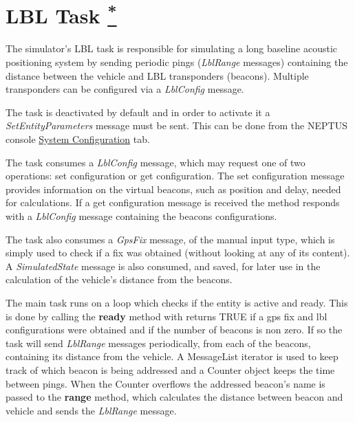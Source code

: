 \documentclass[10pt,a4paper]{article}
\begin{document}
\section{LBL Task \href{https://www.lsts.pt/docs/dune/dune-2017.01.0-dmsmw/d0/dd2/structSimulators_1_1LBL_1_1Task.html}{\textsuperscript{*}}}

\par The simulator's LBL task is responsible for simulating a long baseline acoustic positioning system by sending periodic pings (\textit{LblRange} messages) containing the distance between the vehicle and LBL transponders (beacons). Multiple transponders can be configured via a \textit{LblConfig} message.

\par The task is deactivated by default and in order to activate it a \textit{SetEntityParameters} message must be sent. This can be done from the NEPTUS console \href{https://whale.fe.up.pt/neptus/manual/trunk/elements.html#systems-configuration}{System Configuration} tab.

\par The task consumes a \textit{LblConfig} message, which may request one of two operations: set configuration or get configuration. The set configuration message provides information on the virtual beacons, such as position and delay,  needed for calculations. If a get configuration message is received the method responds with a \textit{LblConfig} message containing the beacons configurations.

\par The task also consumes a \textit{GpsFix} message, of the manual input type, which is simply used to check if a fix was obtained (without looking at any of its content). A \textit{SimulatedState} message is also consumed, and saved, for later use in the calculation of the vehicle's distance from the beacons.

\par The main task runs on a loop which checks if the entity is active and ready. This is done by calling the \textbf{ready} method with returns TRUE if a gps fix and lbl configurations were obtained and if the number of beacons is non zero. If so the task will send \textit{LblRange} messages periodically, from each of the beacons, containing its distance from the vehicle. A MessageList iterator is used to keep track of which beacon is being addressed and a Counter object keeps the time between pings. When the Counter overflows the addressed beacon's name is passed to the \textbf{range} method, which calculates the distance between beacon and vehicle and sends the \textit{LblRange} message.
\end{document}
